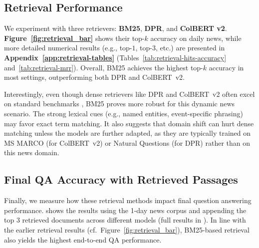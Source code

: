\documentclass[11pt]{article}
\begin{document}
\subsection{Retrieval Performance}
\label{subsec:retrieval-analysis}


We experiment with three retrievers: \textbf{BM25}, \textbf{DPR}, and \textbf{ColBERT v2}.
\textbf{Figure~\ref{fig:retrieval_bar}} shows their top-$k$ accuracy on daily news, 
while more detailed numerical results (e.g., top-$1$, top-$3$, etc.) are presented 
in \textbf{Appendix~\ref{app:retrieval-tables}} 
(Tables~\ref{tab:retrieval-hits-accuracy} and~\ref{tab:retrieval-mrr}). Overall, BM25 achieves the highest top-$k$ accuracy in most settings, outperforming both DPR and ColBERT~v2. 

Interestingly, even though dense retrievers like DPR and ColBERT~v2 often excel on standard benchmarks \citep{bajaj2018msmarcohumangenerated, thakur2021beirheterogenousbenchmarkzeroshot}, BM25 proves more robust for this dynamic news scenario. The strong lexical cues (e.g., named entities, event-specific phrasing) may favor exact term matching. It also suggests that domain shift can hurt dense matching unless the models are further adapted, as they are typically trained on MS MARCO \citep{bajaj2018msmarcohumangenerated} (for ColBERT~v2) or Natural Questions \citep{kwiatkowski-etal-2019-natural}(for DPR) rather than on this news domain.

\subsection{Final QA Accuracy with Retrieved Passages}
\label{subsec:retrieval-qa-accuracy}

Finally, we measure how these retrieval methods
impact final question answering performance.  shows the results using the 1-day news corpus and appending the top 3 retrieved documents across different models (full results in ). In line with the earlier retrieval results (cf.\ Figure~\ref{fig:retrieval_bar}),
BM25-based retrieval also yields the highest end-to-end QA performance. 
\end{document}

